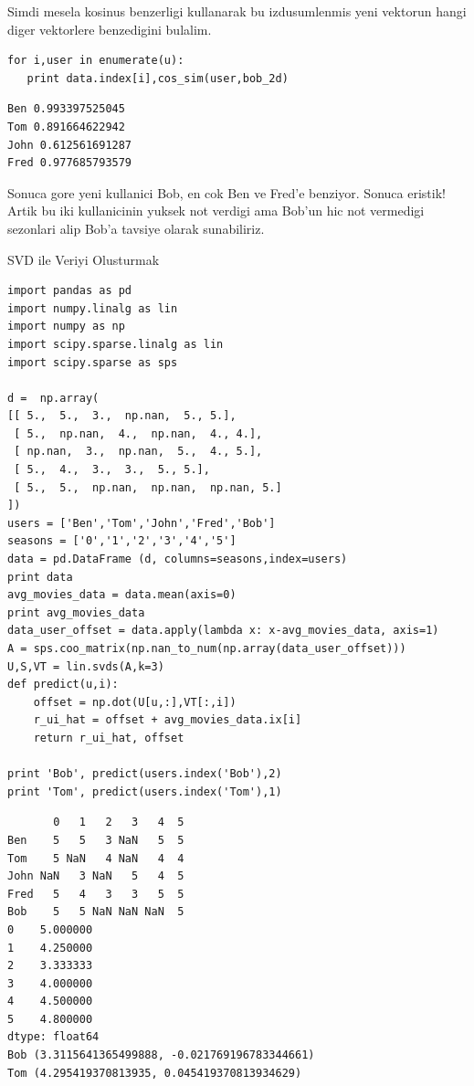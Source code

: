 \documentclass[12pt,fleqn]{article}\usepackage{../common}
\begin{document}
Simdi mesela kosinus benzerligi kullanarak bu izdusumlenmis yeni
vektorun hangi diger vektorlere benzedigini bulalim.

\begin{verbatim}
for i,user in enumerate(u):
   print data.index[i],cos_sim(user,bob_2d)
\end{verbatim}

\begin{verbatim}
Ben 0.993397525045
Tom 0.891664622942
John 0.612561691287
Fred 0.977685793579
\end{verbatim}

Sonuca gore yeni kullanici Bob, en cok Ben ve Fred'e benziyor. Sonuca
eristik! Artik bu iki kullanicinin yuksek not verdigi ama Bob'un hic
not vermedigi sezonlari alip Bob'a tavsiye olarak sunabiliriz.

SVD ile Veriyi Olusturmak

\begin{verbatim}
import pandas as pd
import numpy.linalg as lin
import numpy as np
import scipy.sparse.linalg as lin
import scipy.sparse as sps

d =  np.array(
[[ 5.,  5.,  3.,  np.nan,  5., 5.],
 [ 5.,  np.nan,  4.,  np.nan,  4., 4.],
 [ np.nan,  3.,  np.nan,  5.,  4., 5.],
 [ 5.,  4.,  3.,  3.,  5., 5.],
 [ 5.,  5.,  np.nan,  np.nan,  np.nan, 5.]
])
users = ['Ben','Tom','John','Fred','Bob']
seasons = ['0','1','2','3','4','5']
data = pd.DataFrame (d, columns=seasons,index=users)
print data
avg_movies_data = data.mean(axis=0)
print avg_movies_data
data_user_offset = data.apply(lambda x: x-avg_movies_data, axis=1)
A = sps.coo_matrix(np.nan_to_num(np.array(data_user_offset)))
U,S,VT = lin.svds(A,k=3)
def predict(u,i):
    offset = np.dot(U[u,:],VT[:,i]) 
    r_ui_hat = offset + avg_movies_data.ix[i] 
    return r_ui_hat, offset

print 'Bob', predict(users.index('Bob'),2)
print 'Tom', predict(users.index('Tom'),1)
\end{verbatim}

\begin{verbatim}
       0   1   2   3   4  5
Ben    5   5   3 NaN   5  5
Tom    5 NaN   4 NaN   4  4
John NaN   3 NaN   5   4  5
Fred   5   4   3   3   5  5
Bob    5   5 NaN NaN NaN  5
0    5.000000
1    4.250000
2    3.333333
3    4.000000
4    4.500000
5    4.800000
dtype: float64
Bob (3.3115641365499888, -0.021769196783344661)
Tom (4.295419370813935, 0.045419370813934629)
\end{verbatim}
\end{document}
